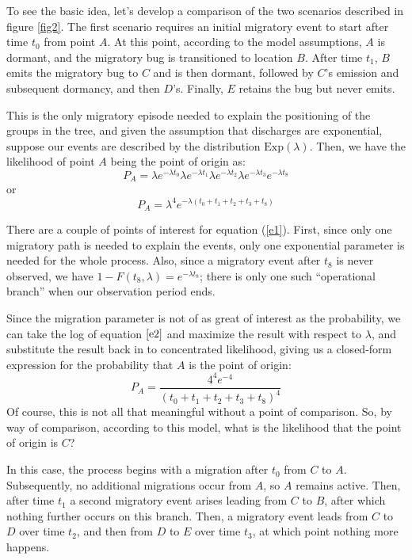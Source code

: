 \documentclass[11pt]{article}
\begin{document}
To see the basic idea, let's develop a comparison of the two scenarios described in figure \ref{fig2}. The first scenario requires an initial migratory event to start after time $t_0$ from point $A$. At this point, according to the model assumptions, $A$ is dormant, and the migratory bug is transitioned to location $B$. After time $t_1$, $B$ emits the migratory bug to $C$ and is then dormant, followed by $C$'s emission and subsequent dormancy, and then $D$'s. Finally, $E$ retains the bug but never emits.

This is the only migratory episode needed to explain the positioning of the groups in the tree, and given the assumption that discharges are exponential, suppose our events are described by the distribution $\textrm{Exp}(\lambda)$. Then, we have the likelihood of point $A$ being the point of origin as:
\begin{equation} \label{e1}
P_A = \lambda e^{-\lambda t_0}\lambda e^{-\lambda t_1}\lambda e^{-\lambda t_2}\lambda e^{-\lambda t_3}e^{-\lambda t_8}
\end{equation}
or
\begin{equation} \label{e2}
P_A = \lambda^4 e^{-\lambda (t_0+t_1+t_2+t_3+t_8)}
\end{equation}

There are a couple of points of interest for equation (\ref{e1}). First, since only one migratory path is needed to explain the events, only one
exponential parameter is needed for the whole process. Also, since a migratory event after $t_8$ is never observed, we have $1-F(t_8,\lambda) = e^{-\lambda t_8}$; there is only one such ``operational branch'' when our observation period ends.

Since the migration parameter is not of as great of interest as the probability, we can take the log of equation $\ref{e2}$ and maximize the result with respect to $\lambda$, and substitute the result back in to concentrated likelihood, giving us a closed-form expression for the probability that $A$ is the point of origin:
\begin{equation} \label{e2}
P_A = \frac{4^4e^{-4}}{(t_0+t_1+t_2+t_3+t_8)^4}
\end{equation}
Of course, this is not all that meaningful without a point of comparison. So, by way of comparison, according to this model, what is the likelihood that the point of origin is $C$?

In this case, the process begins with a migration after $t_0$ from $C$ to $A$. Subsequently, no additional migrations occur from $A$, so $A$ remains active. Then, after time $t_1$ a second migratory event arises leading from $C$ to $B$, after which nothing further occurs on this branch. Then, a migratory event leads from $C$ to $D$ over time $t_2$, and then from $D$ to $E$ over time $t_3$, at which point nothing more happens.
\end{document}

